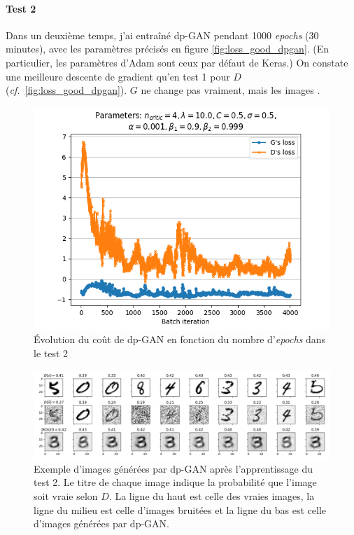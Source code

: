 \documentclass[a4paper,11pt,twoside]{article}
\theoremstyle{definition}
\newcommand{\cf}{\textit{cf.}}
\begin{document}
\paragraph{Test 2}
Dans un deuxième temps, j'ai entraîné dp-GAN pendant 1000 \textit{epochs} (30 minutes), avec les paramètres précisés en figure \autoref{fig:loss_good_dpgan}. (En particulier, les paramètres d'Adam sont ceux par défaut de Keras.) On constate une meilleure descente de gradient qu'en test 1 pour $D$ (\cf\ \autoref{fig:loss_good_dpgan}). $G$ ne change pas vraiment, mais les images .

\begin{figure}
    \includegraphics[width=0.6\linewidth]{test2loss.png}
    \caption{Évolution du coût de dp-GAN en fonction du nombre d'\textit{epochs} dans le test 2}
    \label{fig:loss_good_dpgan}
\end{figure}

\begin{figure}
    \includegraphics[width=\linewidth]{test2im.png}
    \caption{Exemple d'images générées par dp-GAN après l'apprentissage du test 2. Le titre de chaque image indique la probabilité que l'image soit vraie selon $D$. La ligne du haut est celle des vraies images, la ligne du milieu est celle d'images bruitées et la ligne du bas est celle d'images générées par dp-GAN.}
    \label{fig:im_good_dpgan}
\end{figure}
\end{document}
